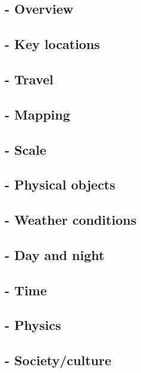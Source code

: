 \subsection{- Overview}
\subsection{- Key locations}
\subsection{- Travel}
\subsection{- Mapping}
\subsection{- Scale}
\subsection{- Physical objects}
\subsection{- Weather conditions}
\subsection{- Day and night}
\subsection{- Time}
\subsection{- Physics}
\subsection{- Society/culture}

